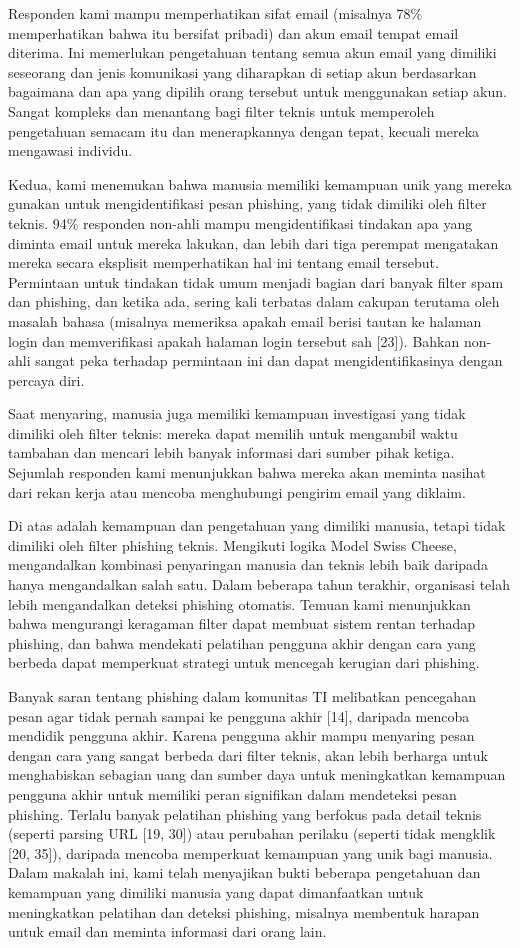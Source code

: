 \documentclass[lettersize,journal]{IEEEtran}
\begin{document}
Responden kami mampu memperhatikan sifat email (misalnya 78\% memperhatikan
bahwa itu bersifat pribadi) dan akun email tempat email diterima. Ini
memerlukan pengetahuan tentang semua akun email yang dimiliki seseorang dan
jenis komunikasi yang diharapkan di setiap akun berdasarkan bagaimana dan apa
yang dipilih orang tersebut untuk menggunakan setiap akun. Sangat kompleks dan
menantang bagi filter teknis untuk memperoleh pengetahuan semacam itu dan
menerapkannya dengan tepat, kecuali mereka mengawasi individu.

Kedua, kami menemukan bahwa manusia memiliki kemampuan unik yang mereka gunakan
untuk mengidentifikasi pesan phishing, yang tidak dimiliki oleh filter teknis.
94\% responden non-ahli mampu mengidentifikasi tindakan apa yang diminta email
untuk mereka lakukan, dan lebih dari tiga perempat mengatakan mereka secara
eksplisit memperhatikan hal ini tentang email tersebut. Permintaan untuk
tindakan tidak umum menjadi bagian dari banyak filter spam dan phishing, dan
ketika ada, sering kali terbatas dalam cakupan terutama oleh masalah bahasa
(misalnya memeriksa apakah email berisi tautan ke halaman login dan
memverifikasi apakah halaman login tersebut sah [23]). Bahkan non-ahli sangat
peka terhadap permintaan ini dan dapat mengidentifikasinya dengan percaya diri.

Saat menyaring, manusia juga memiliki kemampuan investigasi yang tidak dimiliki
oleh filter teknis: mereka dapat memilih untuk mengambil waktu tambahan dan
mencari lebih banyak informasi dari sumber pihak ketiga. Sejumlah responden
kami menunjukkan bahwa mereka akan meminta nasihat dari rekan kerja atau
mencoba menghubungi pengirim email yang diklaim.

Di atas adalah kemampuan dan pengetahuan yang dimiliki manusia, tetapi tidak
dimiliki oleh filter phishing teknis. Mengikuti logika Model Swiss Cheese,
mengandalkan kombinasi penyaringan manusia dan teknis lebih baik daripada hanya
mengandalkan salah satu. Dalam beberapa tahun terakhir, organisasi telah lebih
mengandalkan deteksi phishing otomatis. Temuan kami menunjukkan bahwa
mengurangi keragaman filter dapat membuat sistem rentan terhadap phishing, dan
bahwa mendekati pelatihan pengguna akhir dengan cara yang berbeda dapat
memperkuat strategi untuk mencegah kerugian dari phishing.

Banyak saran tentang phishing dalam komunitas TI melibatkan pencegahan pesan
agar tidak pernah sampai ke pengguna akhir [14], daripada mencoba mendidik
pengguna akhir. Karena pengguna akhir mampu menyaring pesan dengan cara yang
sangat berbeda dari filter teknis, akan lebih berharga untuk menghabiskan
sebagian uang dan sumber daya untuk meningkatkan kemampuan pengguna akhir untuk
memiliki peran signifikan dalam mendeteksi pesan phishing. Terlalu banyak
pelatihan phishing yang berfokus pada detail teknis (seperti parsing URL [19,
    30]) atau perubahan perilaku (seperti tidak mengklik [20, 35]), daripada
mencoba memperkuat kemampuan yang unik bagi manusia. Dalam makalah ini, kami
telah menyajikan bukti beberapa pengetahuan dan kemampuan yang dimiliki manusia
yang dapat dimanfaatkan untuk meningkatkan pelatihan dan deteksi phishing,
misalnya membentuk harapan untuk email dan meminta informasi dari orang lain.
\end{document}
